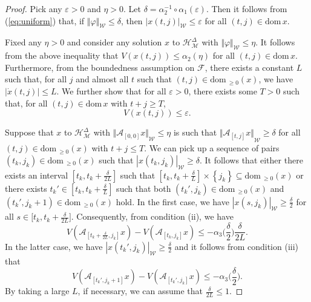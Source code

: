 \documentclass[journal,final,twocolumn]{IEEEtran}
\theoremstyle{definition}
\begin{document}
\begin{proof}
Pick any ${\varepsilon}>0$ and $\eta>0$. Let $\delta=\alpha^{-1}_2\circ\alpha_1({\varepsilon})$. Then it follows from (\ref{eq:uniform}) that, if ${\Vert{\varphi}\Vert}_{\mathcal{W}}\le\delta$, then ${\left\vert{x(t,j)}\right\vert}_{\mathcal{W}}\le{\varepsilon}$ for all $(t,j)\in{\text{dom}\,} x$.

Fixed any $\eta>0$ and consider any solution $x$ to ${\mathcal{H}_{\mathcal{M}}^{\Delta}}$ with ${\Vert{\varphi}\Vert}_{\mathcal{W}}\le \eta$. It follows from the above inequality that $V(x(t,j))\le \alpha_2(\eta)$ for all $(t,j)\in{\text{dom}\,} x$. Furthermore, from the boundedness assumption on ${\mathcal{F}}$, there exists a constant $L$ such that, for all $j$ and almost all $t$ such that $(t,j)\in{\text{dom}\,}_{\ge 0}(x)$, we have ${\left\vert{\dot{x}(t,j)}\right\vert}\le L$. We further show that for all ${\varepsilon}>0$, there exists some $T>0$ such that, for all $(t,j)\in{\text{dom}\,} x$ with $t+j\ge T$, 
\begin{equation}\label{eq:attraction2}
V(x(t,j))\le {\varepsilon}. 
\end{equation}

Suppose that $x$ to ${\mathcal{H}_{\mathcal{M}}^{\Delta}}$ with ${\Vert{{\mathcal{A}}_{[0,0]}x}\Vert}_{\mathcal{W}}\le \eta$ is such that ${\Vert{{\mathcal{A}}_{[t,j]}x}\Vert}_{\mathcal{W}}\ge\delta$ for all $(t,j)\in{\text{dom}\,}_{\ge 0} (x)$ with $t+j\le T$. We can pick up a sequence of pairs $(t_k,j_k)\in{\text{dom}\,}_{\ge 0} (x)$ such that
$
{\left\vert{x(t_k,j_k)}\right\vert}_{\mathcal{W}}\ge\delta.
$
It follows that either there exists an interval $[t_k,t_k+\frac{\delta}{2L}]$ such that $[t_k,t_k+\frac{\delta}{L}]\times{\left\{{j_k}\right\}}{\subseteq}{\text{dom}\,}_{\ge 0}(x)$ or there exists $t_k'\in [t_k,t_k+\frac{\delta}{L}]$ such that both $(t_k',j_k)\in{\text{dom}\,}_{\ge 0}(x)$ and $(t_k',j_k+1)\in{\text{dom}\,}_{\ge 0}(x)$ hold. In the first case, we have
$
{\left\vert{x(s,j_k)}\right\vert}_{\mathcal{W}}\ge\frac{\delta}{2}
$
for all $s\in\big[t_k,t_k+\frac{\delta}{2L}\big].$ 
Consequently, from condition (ii), we have
\begin{equation}\label{eq:flow}
V({\mathcal{A}}_{[t_k+\frac{\delta}{2L},j_k]}x)-V({\mathcal{A}}_{[t_k,j_k]}x)\le -\alpha_3\Big(\frac{\delta}{2}\Big)\frac{\delta}{2L}.
\end{equation}
In the latter case, we have ${\left\vert{x(t_k',j_k)}\right\vert}_{\mathcal{W}}\ge\frac{\delta}{2}$ and it follows from condition (iii) that
\begin{equation}\label{eq:jump}
V({\mathcal{A}}_{[t_k',j_k+1]}x)-V({\mathcal{A}}_{[t_k',j_k]}x)\le -\alpha_3\Big(\frac{\delta}{2}\Big).
\end{equation}
By taking a large $L$, if necessary, we can assume that $\frac{\delta}{2L}\le 1$.


\end{proof}
\end{document}
